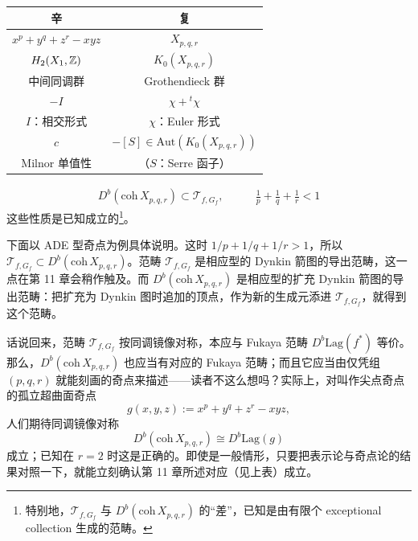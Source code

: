 \begin{table}[htbp]
  \centering
  \begin{tabular}{c|c}
    辛 & 复 \\ \hline
    $x^p+y^q+z^r-xyz$ & $X_{p,q,r}$ \\ \hline
    $H_2(X_1,\mathbb{Z})$ & $K_0(X_{p,q,r})$ \\
    中间同调群 & Grothendieck 群 \\ \hline
    $-I$ & $\chi+{}^t\chi$ \\
    $I$：相交形式 & $\chi$：Euler 形式 \\ \hline
    $c$ & $-[S]\in\mathrm{Aut}(K_0(X_{p,q,r}))$ \\
    Milnor 单值性 & （$S$：Serre 函子） \\
  \end{tabular}
\end{table}

\begin{align*}
  D^b(\mathrm{coh}\,X_{p,q,r}) \subset \mathcal{T}_{f,G_f}, &\qquad \frac{1}{p}+\frac{1}{q}+\frac{1}{r}<1
\end{align*}
这些性质是已知成立的\footnote{特别地，$\mathcal{T}_{f,G_f}$ 与 $D^b(\mathrm{coh}\,X_{p,q,r})$ 的“差”，已知是由有限个 exceptional collection 生成的范畴。}。

下面以 ADE 型奇点为例具体说明。这时 $1/p+1/q+1/r>1$，所以 $\mathcal{T}_{f,G_f}\subset D^b(\mathrm{coh}\,X_{p,q,r})$。范畴 $\mathcal{T}_{f,G_f}$ 是相应型的 Dynkin 箭图的导出范畴，这一点在第 11 章会稍作触及。而 $D^b(\mathrm{coh}\,X_{p,q,r})$ 是相应型的扩充 Dynkin 箭图的导出范畴：把扩充为 Dynkin 图时追加的顶点，作为新的生成元添进 $\mathcal{T}_{f,G_f}$，就得到这个范畴。

话说回来，范畴 $\mathcal{T}_{f,G_f}$ 按同调镜像对称，本应与 Fukaya 范畴 $D^b\mathrm{Lag}(f^*)$ 等价。那么，$D^b(\mathrm{coh}\,X_{p,q,r})$ 也应当有对应的 Fukaya 范畴；而且它应当由仅凭组 $(p,q,r)$ 就能刻画的奇点来描述——读者不这么想吗？实际上，对叫作尖点奇点的孤立超曲面奇点
\[ g(x,y,z) := x^p+y^q+z^r-xyz, \]
人们期待同调镜像对称
\[ D^b(\mathrm{coh}\,X_{p,q,r})\cong D^b\mathrm{Lag}(g) \]
成立；已知在 $r=2$ 时这是正确的。即使是一般情形，只要把表示论与奇点论的结果对照一下，就能立刻确认第 11 章所述对应（见上表）成立。

